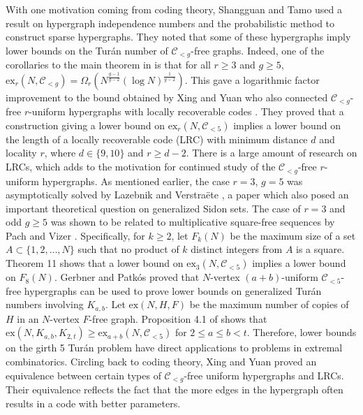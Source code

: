 \documentclass[12pt]{article}%
\begin{document}
With one motivation coming from coding theory, 
Shangguan and Tamo used a result on hypergraph 
independence numbers \cite{DLR} and the probabilistic method to construct sparse hypergraphs.  They noted that some of these hypergraphs imply lower bounds on the Tur\'{a}n number of $\mathcal{C}_{ < g}$-free graphs.  
Indeed, one of the corollaries to the main theorem in \cite{ShangguanTamo1} is that for all $r \geq 3$ and $g \geq 5$, 
$\mathrm{ex}_r ( N , \mathcal{C}_{ < g} )  = \Omega_r ( N^{\frac{g-1}{g-2} } ( \log N )^{ \frac{1}{ g - 2} })$. 
This gave a logarithmic factor improvement to the bound 
obtained by Xing and Yuan who also connected $\mathcal{C}_{ <g }$-free $r$-uniform hypergraphs with locally recoverable codes \cite{XingYuan}.
They proved that a construction giving a lower bound 
on $\textrm{ex}_r( N , \mathcal{C}_{ < 5} )$ implies a lower bound on the length of a locally recoverable code (LRC) with minimum distance $d$ and locality $r$, where $d \in \{ 9 , 10 \}$ and $r \geq d - 2$.  There is a large amount of research on LRCs, which adds to the motivation for continued study of the $\mathcal{C}_{ < g}$-free $r$-uniform hypergraphs.  As mentioned earlier, the case $r = 3$, $g = 5$ was asymptotically solved by 
Lazebnik and Verstra\"{e}te \cite{LV}, a paper which also 
posed an important theoretical question on generalized Sidon sets.  The case of $r = 3$ and odd $g \geq 5$ was shown to be related to multiplicative square-free sequences by Pach and Vizer \cite{PachVizer}. Specifically, for $k \geq 2$, let $F_k (N)$ be the maximum size of a set $A \subset \{1,2, \dots , N \}$ such that no product of $k$ distinct integers from $A$ is a square.  Theorem 11 \cite{PachVizer}  
shows that a lower bound on $\textrm{ex}_{3}( N , \mathcal{C}_{<5} )$ implies a lower bound on 
$F_{8}(N)$. Gerbner and Patk\'{o}s \cite{GerbnerPatkos} proved that $N$-vertex $(a+b)$-uniform $\mathcal{C}_{ < 5}$-free hypergraphs can be used to prove lower bounds on generalized Tur\'{a}n numbers involving $K_{a,b}$.
Let $\textrm{ex}(N, H,F)$ be the maximum number of copies of $H$ in an $N$-vertex $F$-free graph.
Proposition 4.1 of \cite{GerbnerPatkos} shows that $\textrm{ex}(N, K_{a,b} , K_{2,t}) 
\geq \textrm{ex}_{a+b}(N, \mathcal{C}_{< 5} )$ 
for $2 \leq a \leq b < t$.  Therefore, lower bounds on the girth 5 Tur\'{a}n problem have direct applications to problems in extremal combinatorics.  
Circling back to coding theory, Xing and Yuan \cite{XingYuan2} proved an 
equivalence between certain types of $\mathcal{C}_{ <g}$-free uniform hypergraphs and LRCs.  Their equivalence reflects the fact that the more edges in the hypergraph often results in a code with better parameters. 
\end{document}
